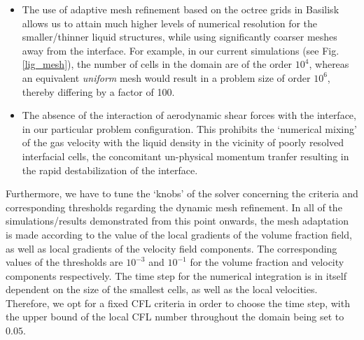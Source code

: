 \begin{itemize}
	\item The use of adaptive mesh refinement based on the octree grids in Basilisk allows 
		us to attain much higher levels of numerical resolution for the smaller/thinner 
		liquid structures, while using significantly coarser meshes away from the interface.
		For example, in our current simulations (see Fig. \ref{lig_mesh}), the number of cells
		in the domain are of the order $10^4$, whereas an equivalent \textit{uniform} mesh 
		would result in a problem size of order $10^6$, thereby differing by a factor of 100.
	\item The absence of the interaction of aerodynamic shear forces with the interface, in our particular
		problem configuration. This prohibits the `numerical mixing' of the gas velocity with the
		liquid density in the vicinity of poorly resolved interfacial cells, the concomitant 
		un-physical momentum tranfer resulting in the rapid destabilization of the interface.   
\end{itemize}

Furthermore, we have to tune the `knobs' of the 
solver concerning the criteria and corresponding 
thresholds regarding the dynamic mesh refinement. 
In all of the simulations/results demonstrated 
from this point onwards, the mesh adaptation is 
made according to the value of the local 
gradients of the volume fraction field, 
as well as local gradients of the velocity field components.  
The corresponding values of the thresholds are $10^{-3}$ 
and $10^{-1}$ for the volume fraction and velocity components respectively. 
The time step for the numerical integration is in itself dependent on the 
size of the smallest cells, as well as the local velocities. 
Therefore, we opt for a fixed CFL criteria in order to choose the time step, 
with the upper bound of the local CFL number throughout the domain being set to $0.05$.

